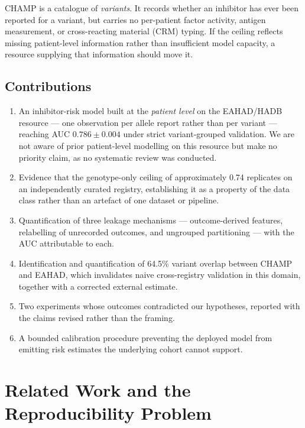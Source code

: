 \documentclass[conference]{IEEEtran}
\begin{document}
CHAMP is a catalogue of \textit{variants}. It records whether an inhibitor has
ever been reported for a variant, but carries no per-patient factor activity,
antigen measurement, or cross-reacting material (CRM) typing. If the ceiling
reflects missing patient-level information rather than insufficient model
capacity, a resource supplying that information should move it.

\subsection{Contributions}
\begin{enumerate}
\item An inhibitor-risk model built at the \textit{patient level} on the
      EAHAD/HADB resource --- one observation per allele report rather than
      per variant --- reaching AUC $0.786 \pm 0.004$ under strict
      variant-grouped validation. We are not aware of prior patient-level
      modelling on this resource but make no priority claim, as no systematic
      review was conducted.
\item Evidence that the genotype-only ceiling of approximately 0.74 replicates
      on an independently curated registry, establishing it as a property of
      the data class rather than an artefact of one dataset or pipeline.
\item Quantification of three leakage mechanisms --- outcome-derived features,
      relabelling of unrecorded outcomes, and ungrouped partitioning --- with
      the AUC attributable to each.
\item Identification and quantification of 64.5\% variant overlap between
      CHAMP and EAHAD, which invalidates naive cross-registry validation in
      this domain, together with a corrected external estimate.
\item Two experiments whose outcomes contradicted our hypotheses, reported
      with the claims revised rather than the framing.
\item A bounded calibration procedure preventing the deployed model from
      emitting risk estimates the underlying cohort cannot support.
\end{enumerate}

\section{Related Work and the Reproducibility Problem}
\end{document}
